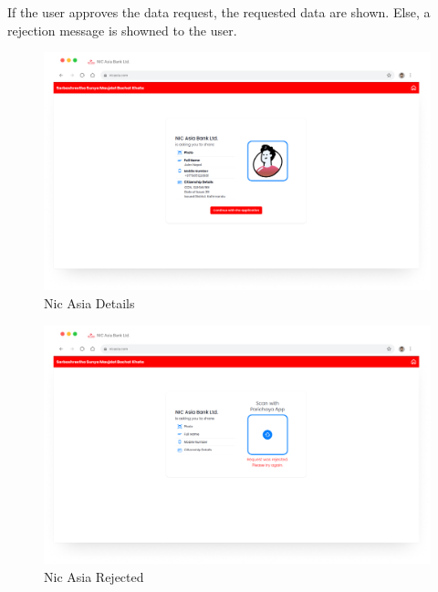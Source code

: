         If the user approves the data request, the requested data are shown. Else, a rejection message is showned to the user.  
         \begin{figure}[H]
        \centering
        \includegraphics[width=0.8\linewidth]{images/results/web/NICDetails.png}
        \caption[Nic Asia Details]{Nic Asia Details}
        \label{fig:NICDetails.png}
        \end{figure}
        \begin{figure}[H]
        \centering
        \includegraphics[width=0.8\linewidth]{images/results/web/NICRejected.png}
        \caption[Nic Asia Rejected]{Nic Asia Rejected}
        \label{fig:NICRejected.png}
        \end{figure}
        


